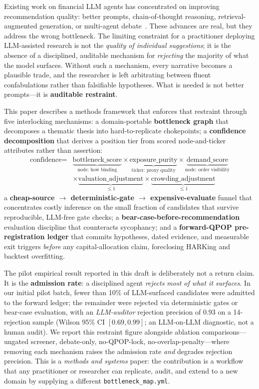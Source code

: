 \documentclass[11pt]{article}
\begin{document}
Existing work on financial LLM agents has concentrated on improving recommendation quality:
better prompts, chain-of-thought reasoning, retrieval-augmented generation, or multi-agent
debate~\citep{xiao2024tradingagents,du2024multiagentdebate}.
These advances are real, but they address the wrong bottleneck.
The limiting constraint for a practitioner deploying LLM-assisted research is not the
\emph{quality of individual suggestions}; it is the absence of a disciplined, auditable
mechanism for \emph{rejecting} the majority of what the model surfaces.
Without such a mechanism, every narrative becomes a plausible trade, and the researcher
is left arbitrating between fluent confabulations rather than falsifiable hypotheses.
What is needed is not better prompts---it is \textbf{auditable restraint}.

This paper describes a methods framework that enforces that restraint through five
interlocking mechanisms: a domain-portable \textbf{bottleneck graph} that decomposes
a thematic thesis into hard-to-replicate chokepoints; a \textbf{confidence decomposition} that
derives a position tier from scored node-and-ticker attributes rather than assertion:
%
\[
  \begin{aligned}
  \text{confidence} = {}&\underbrace{\text{bottleneck\_score}}_{\text{node: how binding}}
    \times \underbrace{\text{exposure\_purity}}_{\text{ticker: proxy quality}}
    \times \underbrace{\text{demand\_score}}_{\text{node: order visibility}} \\
    &\times \underbrace{\text{valuation\_adjustment}}_{\leq 1}
    \times \underbrace{\text{crowding\_adjustment}}_{\leq 1}
  \end{aligned}
\]
%
a \textbf{cheap-source $\to$ deterministic-gate $\to$ expensive-evaluate} funnel that
concentrates costly inference on the small fraction of candidates that survive
reproducible, LLM-free gate checks; a \textbf{bear-case-before-recommendation} evaluation
discipline that counteracts sycophancy; and a \textbf{forward-QPOP pre-registration ledger}
that commits hypotheses, dated evidence, and measurable exit triggers \emph{before} any
capital-allocation claim, foreclosing HARKing and backtest overfitting.

The pilot empirical result reported in this draft is deliberately not a return claim.
It is the \textbf{admission rate}: a disciplined agent \emph{rejects most of what it
surfaces}.
In our initial pilot batch, fewer than 10\% of LLM-surfaced candidates were admitted to the
forward ledger; the remainder were rejected via deterministic gates or bear-case evaluation,
with an \emph{LLM-auditor} rejection precision of 0.93 on a 14-rejection sample (Wilson 95\% CI
$[0.69,0.99]$; an LLM-on-LLM diagnostic, not a human audit).
We report this restraint figure alongside ablation comparisons---ungated screener,
debate-only, no-\textsc{QPOP}-lock, no-overlap-penalty---where removing each mechanism
raises the admission rate \emph{and} degrades rejection precision.
This is a \emph{methods and systems} paper: the contribution is a workflow that any
practitioner or researcher can replicate, audit, and extend to a new domain by supplying
a different \texttt{bottleneck\_map.yml}.
\end{document}

